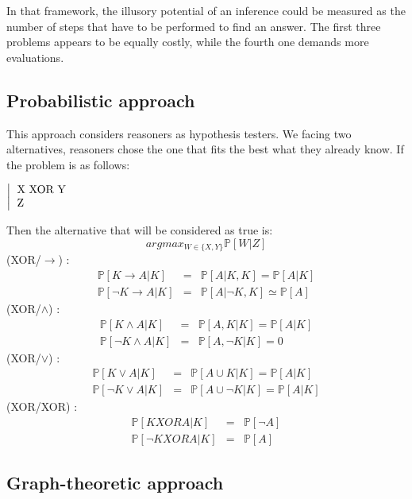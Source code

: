 \documentclass[french]{article}
\begin{document}
In that framework, the illusory potential of an inference could be measured as the number of steps that have to be performed to find an answer. The first three problems appears to be equally costly, while the fourth one demands more evaluations.
\subsection{Probabilistic approach}
This approach considers reasoners as hypothesis testers. We facing two alternatives, reasoners chose the one that fits the best what they already know. If the problem is as follows:
\begin{center}
	$\left |\begin{tabular}{l}
	X XOR Y\\
	Z
\end{tabular}\right.$
\end{center}
Then the alternative that will be considered as true is:
\begin{equation}
argmax_{W \in \lbrace X, Y \rbrace} \mathbb{P}[W|Z]
\end{equation}
(XOR/$\rightarrow$) : \\
\begin{eqnarray}
\mathbb{P}[K \rightarrow A|K] &=& \mathbb{P}[A|K, K] = \mathbb{P}[A|K]\\
\mathbb{P}[\neg K \rightarrow A|K] &=& \mathbb{P}[A|\neg K, K] \simeq \mathbb{P}[A]
\end{eqnarray}
(XOR/$\wedge$) : \\
\begin{eqnarray}
\mathbb{P}[K \wedge A|K] &=& \mathbb{P}[A, K|K] = \mathbb{P}[A|K]\\
\mathbb{P}[\neg K \wedge A|K] &=& \mathbb{P}[A, \neg K| K] = 0
\end{eqnarray}
(XOR/$\vee$) : \\
\begin{eqnarray}
\mathbb{P}[K \vee A|K] &=& \mathbb{P}[A \cup K|K] = \mathbb{P}[A|K]\\
\mathbb{P}[\neg K \vee A|K] &=& \mathbb{P}[A \cup \neg K| K] = \mathbb{P}[A|K]
\end{eqnarray}
(XOR/XOR) : \\
\begin{eqnarray}
\mathbb{P}[K XOR A|K] &=& \mathbb{P}[\neg A]\\
\mathbb{P}[\neg K XOR A|K] &=& \mathbb{P}[A]
\end{eqnarray}
\subsection{Graph-theoretic approach}
\end{document}

